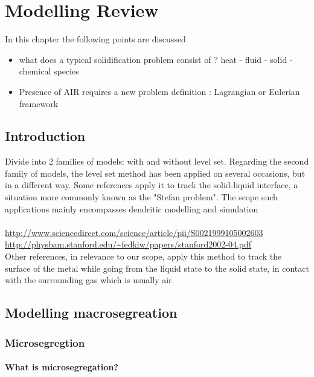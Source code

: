 \chapter{Modelling Review}
\begin{nolinkcolors} 
\minitoc
\end{nolinkcolors}
\newpage

In this chapter the following points are discussed
\begin{itemize}
\item what does a typical solidification problem consist of ? heat - fluid - solid 
- chemical species
\item Presence of AIR requires a new problem definition : Lagrangian or Eulerian framework
\end{itemize}

\section{Introduction}
Divide into 2 families of models: with and without level set. Regarding the second family of models,
the level set method has been applied on several occasions, but in a different way. Some references
apply it to track the solid-liquid interface, a situation more commonly known as the "Stefan problem".
The scope such applications mainly encompasses dendritic modelling and simulation \\
 \\
\url{http://www.sciencedirect.com/science/article/pii/S0021999105002603} \\
\url{http://physbam.stanford.edu/~fedkiw/papers/stanford2002-04.pdf} \\
Other references, in relevance to our scope, apply this method to track the surface of the metal
while going from the liquid state to the solid state, in contact with the surrounding gas which is usually air. \\

\section{Modelling macrosegreation}
\subsection{Microsegregtion}

\subsubsection{What is microsegregation?}


